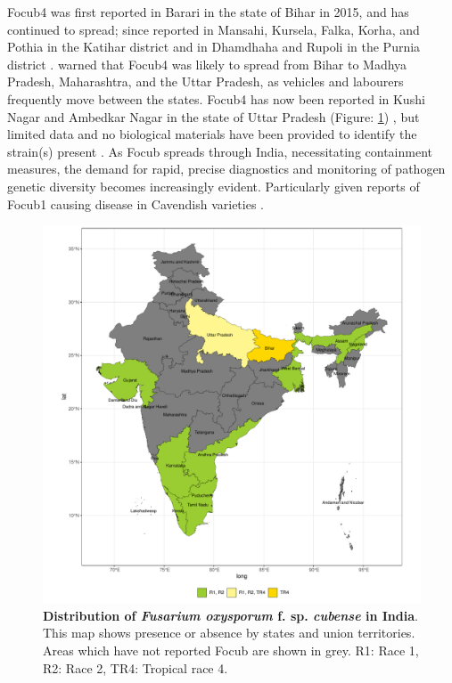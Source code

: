 \Ac{Focub4} was first reported in Barari in the state of Bihar in 2015, and has continued to spread; since  reported in Mansahi, Kursela, Falka, Korha, and Pothia in the Katihar district and in Dhamdhaha and Rupoli in the Purnia district \parencite{Thangavelu2019}. \textcite{Viljoen2020} warned that \ac{Focub4} was likely to spread from Bihar to Madhya Pradesh, Maharashtra, and the Uttar Pradesh, as vehicles and labourers frequently move between the states. \ac{Focub4} has now been reported in Kushi Nagar and Ambedkar Nagar in the state of Uttar Pradesh (Figure: \ref{fig:FocDisIndia}) \parencite{Damodaran2019, Thangavelu2019}, but limited data and no biological materials have been provided to identify the strain(s) present \parencite{Kema2021}. As \ac{Focub} spreads through India, necessitating containment measures, the demand for rapid, precise diagnostics and monitoring of pathogen genetic diversity becomes increasingly evident. Particularly given reports of \ac{Focub1} causing disease in Cavendish varieties \parencite{Thangavelu2020}.

\begin{figure}[hp!]
  \includegraphics[width=15cm]{Figures/FocDis_India.pdf}
  \caption[Distribution of \textit{Fusarium oxysporum} f. sp. \textit{cubense} in India]{\textbf{ Distribution of \textit{Fusarium oxysporum} f. sp. \textit{cubense} in India}. This map shows presence or absence by states and union territories. Areas which have not reported \ac{Focub} are shown in grey. R1: Race 1, R2: Race 2, TR4: Tropical race 4.}
  \label{fig:FocDisIndia}
\end{figure}

